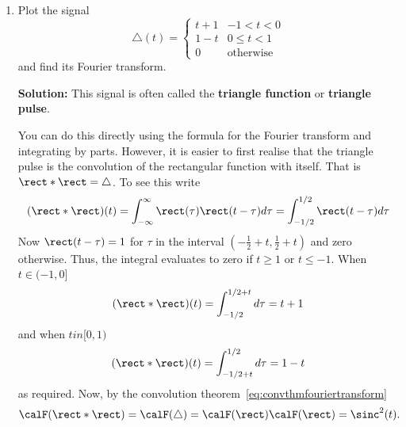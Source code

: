 \documentclass[11pt,a4paper]{book}
\theoremstyle{plain}
\numberwithin{equation}{section}
\newcommand{\term}{\textbf}
\newcommand{\vtick}[1]{\draw (#1,-0.075) -- (#1,0.075) }
\newcommand{\htick}[1]{\draw (-0.075,#1) -- (0.075,#1)}
\newenvironment{solution}{\begin{footnotesize}\textbf{Solution:}}{\end{footnotesize}}
\newenvironment{excersizelist}{%
  \renewcommand*{\theenumi}{\thechapter.\arabic{enumi}}%
  \newcommand\itemadvanced{\stepcounter{enumi}\item[$\ast$\, \theenumi.]}
  \begin{enumerate}
}{%
  \end{enumerate}
}
\begin{document}
\begin{excersizelist}
\item \label{exer:triangle_pulse_ft} Plot the signal
\[
\bigtriangleup(t) = \begin{cases}
t + 1 & -1 < t < 0 \\
1 - t & 0 \leq t < 1 \\
0 & \text{otherwise}
\end{cases}
\]
and find its Fourier transform.
\begin{solution}
This signal is often called the \term{triangle function} or \term{triangle pulse}.
\begin{center}
\end{center}

You can do this directly using the formula for the Fourier transform and integrating by parts.  However, it is easier to first realise that the triangle pulse is the convolution of the rectangular function with itself.  That is $\rect * \rect = \bigtriangleup$.  To see this write
\[
(\rect * \rect)(t) = \int_{-\infty}^\infty \rect(\tau)\rect(t - \tau) d\tau = \int_{-1/2}^{1/2} \rect(t - \tau) d\tau
\] 
Now $\rect(t - \tau) = 1$ for $\tau$ in the interval $(-\tfrac{1}{2}+ t,\tfrac{1}{2} + t)$ and zero otherwise. 
Thus, the integral evaluates to zero if $t \geq 1$ or $t \leq -1$.  When $t \in (-1,0]$
\[
(\rect * \rect)(t) = \int_{-1/2}^{1/2+t} d\tau = t + 1
\]
and when $t in [0,1)$
\[
(\rect * \rect)(t) = \int_{-1/2+t}^{1/2} d\tau = 1 - t
\]
as required.  Now, by the convolution theorem~\eqref{eq:convthmfouriertransform}
\[
\calF(\rect * \rect) = \calF(\bigtriangleup) = \calF(\rect) \calF(\rect) = \sinc^2(t).
\]
\end{solution}


\end{excersizelist}
\end{document}
